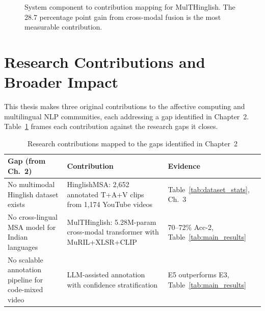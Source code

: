 \begin{figure}[ht]
\centering
{}
\caption{System component to contribution mapping for MulTHinglish. The 28.7 percentage point gain from cross-modal fusion is the most measurable contribution.}
\label{fig:tikz_contribution}
\end{figure}

\section{Research Contributions and Broader Impact}

This thesis makes three original contributions to the affective computing and multilingual NLP communities, each addressing a gap identified in Chapter~2. Table~\ref{tab:contributions} frames each contribution against the research gaps it closes.

\begin{table}[ht]
\centering
\caption{Research contributions mapped to the gaps identified in Chapter~2}
\label{tab:contributions}
\renewcommand{\arraystretch}{1.35}
\begin{tabular}{p{3.8cm} p{4.5cm} p{3.5cm}}
\toprule
\textbf{Gap (from Ch.\ 2)} & \textbf{Contribution} & \textbf{Evidence} \\
\midrule
No multimodal Hinglish dataset exists & HinglishMSA: 2,652 annotated T+A+V clips from 1,174 YouTube videos & Table~\ref{tab:dataset_stats}, Ch.\ 3 \\
No cross-lingual MSA model for Indian languages & MulTHinglish: 5.28M-param cross-modal transformer with MuRIL+XLSR+CLIP & 70--72\% Acc-2, Table~\ref{tab:main_results} \\
No scalable annotation pipeline for code-mixed video & LLM-assisted annotation with confidence stratification & E5 outperforms E3, Table~\ref{tab:main_results} \\
\bottomrule
\end{tabular}
\end{table}

